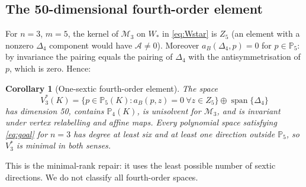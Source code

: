 \documentclass[11pt,a4paper]{article}
\newtheorem{corollary}[theorem]{Corollary}
\theoremstyle{definition}
\theoremstyle{remark}
\newcommand{\M}{\mathcal M}
\newcommand{\Pol}{\mathbb P}
\begin{document}
\subsection{The 50-dimensional fourth-order element}
\label{sec:explicit}

For \(n=3\), \(m=5\), the kernel of \(\M_3\) on \(W_*\) in \eqref{eq:Wstar}
is \(Z_5\) (an element with a nonzero \(\Delta_4\) component would have
\(\mathcal A\ne0\)). Moreover \(a_B(\Delta_4,p)=0\) for \(p\in\Pol_5\): by
invariance the pairing equals the pairing of \(\Delta_4\) with the
antisymmetrisation of \(p\), which is zero. Hence:

\begin{corollary}[One-sextic fourth-order element]
\label{cor:fourth}
The space
\begin{equation}
 V_3^*(K)=\{p\in\Pol_5(K):a_B(p,z)=0\ \forall z\in Z_5\}\oplus
 \operatorname{span}\{\Delta_4\}
 \label{eq:V3}
\end{equation}
has dimension 50, contains \(\Pol_4(K)\), is unisolvent for \(\M_3\), and is
invariant under vertex relabelling and affine maps. Every polynomial space
satisfying \eqref{eq:goal} for \(n=3\) has degree at least six and at least
one direction outside \(\Pol_5\), so \(V_3^*\) is minimal in both senses.
\end{corollary}

This is the minimal-rank repair: it uses the least possible number of
sextic directions. We do not classify all fourth-order spaces.
\end{document}
